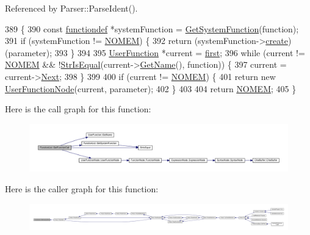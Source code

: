 Referenced by Parser\+::\+Parse\+Ident().


\begin{DoxyCode}
389 \{
390     \textcolor{keyword}{const} \hyperlink{structfunctiondef}{functiondef} *systemFunction = \hyperlink{classFunctionList_aabcebb1bdf56aee163f96483dcdc603c}{GetSystemFunction}(\textcolor{keyword}{function});
391     \textcolor{keywordflow}{if} (systemFunction != \hyperlink{platform_8h_a46ff2bfbf0d44b8466a2251d5bd5e6f8}{NOMEM}) \{
392         \textcolor{keywordflow}{return} (systemFunction->\hyperlink{structfunctiondef_a323f2d4c5ae5923f8f76c76b3c77b42e}{create})(parameter);
393     \}
394 
395     \hyperlink{classUserFunction}{UserFunction} *current = \hyperlink{classFunctionList_a4a0534f4240022c58c3e06234e7f9f99}{first};
396     \textcolor{keywordflow}{while} (current != \hyperlink{platform_8h_a46ff2bfbf0d44b8466a2251d5bd5e6f8}{NOMEM} && !\hyperlink{clib_8h_a2a1f39d11cbbaac992d42e67557dac4b}{StrIsEqual}(current->\hyperlink{classUserFunction_a59c59ebf5b45c5bb4aaa200a1218549d}{GetName}(), \textcolor{keyword}{function})) \{
397         current = current->\hyperlink{classUserFunction_a5463f575d2ed50c0dbe069ec2841a5c9}{Next};
398     \}
399 
400     \textcolor{keywordflow}{if} (current != \hyperlink{platform_8h_a46ff2bfbf0d44b8466a2251d5bd5e6f8}{NOMEM}) \{
401         \textcolor{keywordflow}{return} \textcolor{keyword}{new} \hyperlink{classUserFunctionNode}{UserFunctionNode}(current, parameter);
402     \}
403 
404     \textcolor{keywordflow}{return} \hyperlink{platform_8h_a46ff2bfbf0d44b8466a2251d5bd5e6f8}{NOMEM};
405 \}
\end{DoxyCode}


Here is the call graph for this function\+:
\nopagebreak
\begin{figure}[H]
\begin{center}
\leavevmode
\includegraphics[width=350pt]{d1/d79/classFunctionList_ae8dc9d2913429faefdfed463ae3272c1_cgraph}
\end{center}
\end{figure}




Here is the caller graph for this function\+:
\nopagebreak
\begin{figure}[H]
\begin{center}
\leavevmode
\includegraphics[width=350pt]{d1/d79/classFunctionList_ae8dc9d2913429faefdfed463ae3272c1_icgraph}
\end{center}
\end{figure}


